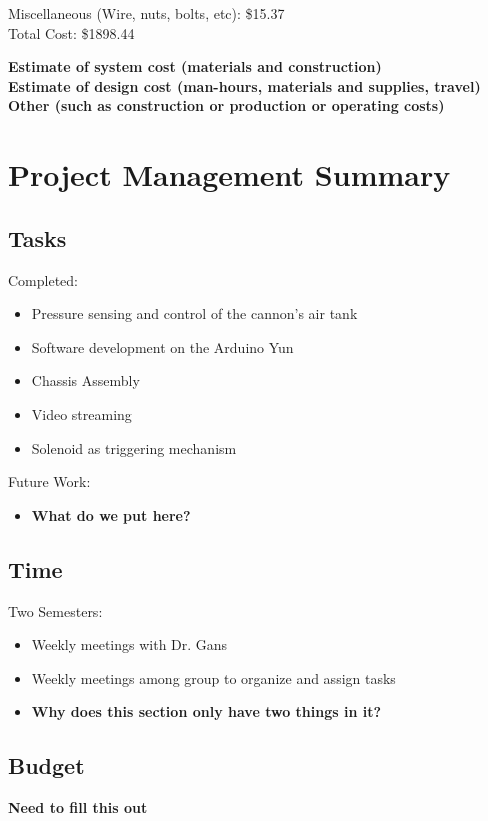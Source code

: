 \documentclass[letterpaper,12pt]{article}
\newcommand{\xxx}[1]{{\color{red}\bf #1}}
\begin{document}
Miscellaneous (Wire, nuts, bolts, etc): \$15.37 \\

Total Cost: \$1898.44

\xxx{Estimate of system cost (materials and construction)} \\
\xxx{Estimate of design cost (man-hours, materials and supplies, travel)} \\
\xxx{Other (such as construction or production or operating costs)}

\section{Project Management Summary}
\label{sec:projman}

\subsection{Tasks}
Completed:
\begin{itemize}
    \item Pressure sensing and control of the cannon's air tank
    \item Software development on the Arduino Yun
    \item Chassis Assembly
    \item Video streaming
    \item Solenoid as triggering mechanism
\end{itemize}

Future Work:
\begin{itemize}
    \item \xxx{What do we put here?}
\end{itemize}

\subsection{Time}
Two Semesters:
\begin{itemize}
    \item Weekly meetings with Dr. Gans
    \item Weekly meetings among group to organize and assign tasks
    \item \xxx{Why does this section only have two things in it?}
\end{itemize}

\subsection{Budget}
\xxx{Need to fill this out}
\end{document}
